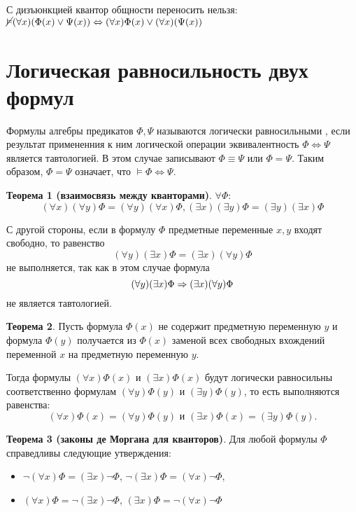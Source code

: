 С дизъюнкцией квантор общности переносить нельзя: $\cancel{\vDash} (\forall x)(\Phi(x)\lor\Psi(x)) \Leftrightarrow (\forall x)\Phi(x) \lor (\forall x)(\Psi(x))$

\section{Логическая равносильность двух формул}

\dftion Формулы алгебры предикатов  $\Phi, \Psi$ называются логически равносильными
, если результат примененния к ним логической операции эквивалентность $\Phi \Leftrightarrow \Psi$ является тавтологией.
В этом случае записывают $\Phi \equiv \Psi$ или $\Phi = \Psi$.
Таким образом, $\Phi = \Psi$ означает, что $\vDash \Phi \Leftrightarrow \Psi$.

\textbf{Теорема 1 (взаимосвязь между кванторами)}.
$\forall \Phi$:
\begin{equation*}
    (\forall x)(\forall y) \Phi = (\forall y)(\forall x)\Phi, (\exists x)(\exists y) \Phi = (\exists y)(\exists x)\Phi
\end{equation*}

С другой стороны, если в формулу $\Phi$ предметные переменные $x, y$ входят свободно, то равенство
$$(\forall y)(\exists x)\Phi = (\exists x)(\forall y)\Phi$$
не выполняется, так как в этом случае формула
$$(\forall y)(\exists x)\Phi \Rightarrow (\exists x)(\forall y)\Phi$$
не является тавтологией.

\textbf{Теорема 2}. Пусть формула $\Phi(x)$ не содержит предметную переменную $y$ и формула $\Phi(y)$ получается из $\Phi(x)$ заменой всех свободных вхождений переменной $x$ на предметную переменную $y$.

Тогда формулы $(\forall x)\Phi(x)$ и $(\exists x)\Phi(x)$ будут логически равносильны соответственно формулам $(\forall y)\Phi(y)$ и $(\exists y)\Phi(y)$, то есть выполняются равенства:
$$(\forall x)\Phi(x) = (\forall y)\Phi(y)\text{ и }(\exists x)\Phi(x) = (\exists y)\Phi(y).$$

\textbf{Теорема 3 (законы де Моргана для кванторов)}. Для любой формулы $\Phi$ справедливы следующие утверждения:
\begin{itemize}
    \item $\lnot(\forall x)\Phi = (\exists x)\lnot \Phi$, $\lnot(\exists x)\Phi = (\forall x)\lnot \Phi$,
    \item $(\forall x)\Phi = \lnot(\exists x)\lnot \Phi$, $(\exists x)\Phi = \lnot(\forall x)\lnot \Phi$
\end{itemize}

